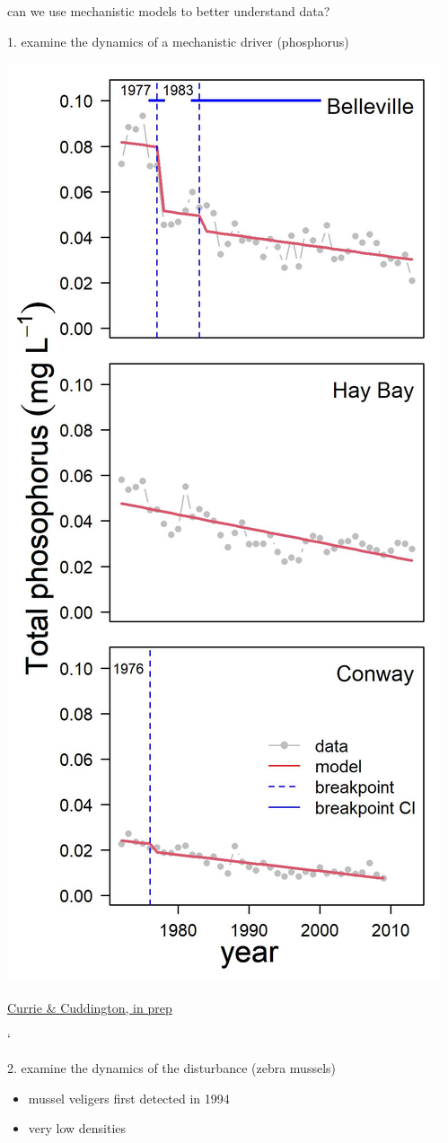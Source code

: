\documentclass[
  ignorenonframetext,
]{beamer}
\providecommand{\tightlist}{%
  \setlength{\itemsep}{0pt}\setlength{\parskip}{0pt}}
\begin{document}
\begin{frame}{can we use mechanistic models to better understand data?}
\begin{block}{1. examine the dynamics of a mechanistic driver
(phosphorus)}
\begin{center}\includegraphics[width=0.6\linewidth]{TPbreak} \end{center}

\href{}{Currie \& Cuddington, in prep}

`
\end{block}

\begin{block}{2. examine the dynamics of the disturbance (zebra
mussels)}
\protect\hypertarget{examine-the-dynamics-of-the-disturbance-zebra-mussels}{}
\begin{itemize}
\tightlist
\item
  mussel veligers first detected in 1994
\item
  very low densities
\end{itemize}


\end{block}
\end{frame}
\end{document}
